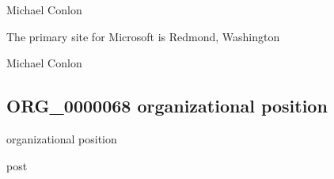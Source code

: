 \documentclass[letterpaper,10pt,english]{sphinxmanual}
\begin{document}
\begin{sphinxShadowBox}

\sphinxAtStartPar
Michael Conlon 
\end{sphinxShadowBox}

\begin{sphinxShadowBox}

\sphinxAtStartPar
The primary site for Microsoft is Redmond, Washington
\end{sphinxShadowBox}

\begin{sphinxShadowBox}

\sphinxAtStartPar
Michael Conlon 
\end{sphinxShadowBox}
\begin{quote}

\ignorespaces \end{quote}


\subsection{ORG\_0000068 \sphinxhyphen{} organizational position}
\label{\detokenize{doc-ORG_0000068:org-0000068-organizational-position}}\label{\detokenize{doc-ORG_0000068:index-0}}\label{\detokenize{doc-ORG_0000068::doc}}
\begin{sphinxShadowBox}

\sphinxAtStartPar
organizational position
\end{sphinxShadowBox}

\begin{sphinxShadowBox}

\sphinxAtStartPar
post
\end{sphinxShadowBox}

\begin{sphinxShadowBox}

\sphinxAtStartPar
{\hyperref[\detokenize{doc-BFO_0000003::doc}]{}}
\end{sphinxShadowBox}
\end{document}

